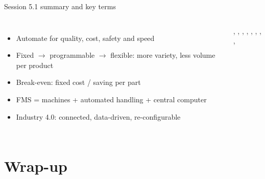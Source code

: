 \documentclass[aspectratio=169,10pt]{beamer}
\begin{document}
\begin{frame}[t]{Session 5.1 summary and key terms}
\begin{columns}[T,onlytextwidth]
\begin{itemize}\small
\item Automate for quality, cost, safety and speed
\item Fixed $\rightarrow$ programmable $\rightarrow$ flexible: more variety, less volume per product
\item Break-even: fixed cost / saving per part
\item FMS = machines + automated handling + central computer
\item Industry 4.0: connected, data-driven, re-configurable
\end{itemize}
\begin{defbox}
\small
{}, , , , , , , , 
\end{defbox}
\end{columns}
\end{frame}

\section*{Wrap-up}
\end{document}
